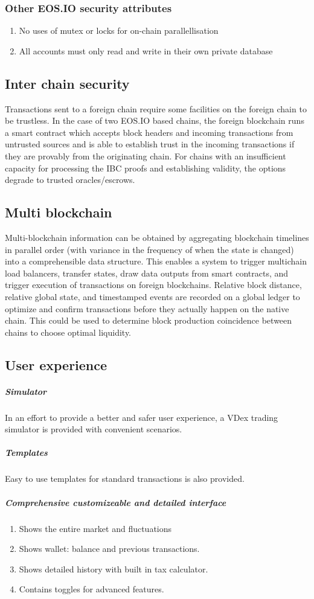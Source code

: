 \documentclass[]{article}
\begin{document}
{		\subsubsection{Other EOS.IO security attributes}
		\begin{enumerate}
		\item No uses of mutex or locks for on-chain parallellisation
		\item All accounts must only read and write in their own private database
		\end{enumerate}
		
	\subsection{Inter chain security}
	
	Transactions sent to a foreign chain require some facilities on the foreign chain to be trustless. 
	In the case of two EOS.IO based chains, the foreign blockchain runs a smart contract which accepts block headers and incoming transactions 
	from untrusted sources and is able to establish trust in the incoming transactions if they are provably from the originating chain. 
	For chains with an insufficient capacity for processing the IBC proofs and establishing validity, the options degrade to trusted oracles/escrows.
	
	
	\subsection{Multi blockchain}
	Multi-blockchain information can be obtained by aggregating blockchain timelines in parallel order 
	(with variance in the frequency of when the state is changed) into a comprehensible data structure.
	This enables a system to trigger multichain load balancers, transfer states, draw data outputs from smart contracts, 
	and trigger execution of transactions on foreign blockchains. 
	Relative block distance, relative global state, and timestamped events are recorded on a global ledger to optimize and confirm transactions 
	before they actually happen on the native chain.
	This could be used to determine block production coincidence between chains to choose optimal liquidity.\cite{20}
	
	\subsection{User experience}
	\subparagraph{Simulator}
	In an effort to provide a better and safer user experience, 
	a VDex trading simulator is provided with convenient scenarios.
	\subparagraph{Templates}
	Easy to use templates for standard transactions is also provided.
	\subparagraph{Comprehensive customizeable and detailed interface}
	\begin{enumerate}
		\item Shows the entire market and fluctuations
		\item Shows wallet: balance and previous transactions.
		\item Shows detailed history with built in tax calculator.
		\item Contains toggles for advanced features.		 
	\end{enumerate}
	
}
\end{document}

